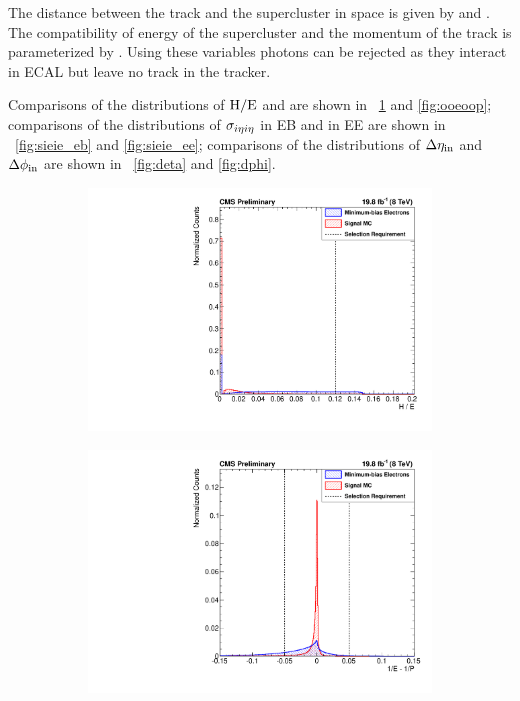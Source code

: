 The distance between the track and the supercluster in \coordetaphi space is
given by \dphiin and \detain. The compatibility of energy of the supercluster
and the momentum of the track is parameterized by \ooeoop. Using these
variables photons can be rejected as they interact in ECAL but leave no track
in the tracker.

Comparisons of the distributions of $\text{H}/\text{E}$ and \ooeoop are shown in
\FIG~\ref{fig:he} and \ref{fig:ooeoop}; comparisons of the distributions of
$\sigma_{i \eta i \eta}$ in EB and in EE are shown in \FIGS~\ref{fig:sieie_eb} and
\ref{fig:sieie_ee}; comparisons of the distributions of $\Delta \eta_{\text{in}}$ and $\Delta \phi_{\text{in}}$
are shown in \FIGS~\ref{fig:deta} and \ref{fig:dphi}.

\begin{figure}[!htbp]
    \centering
    \begin{subfigure}[b]{\StackedPlotWidth}
        \includegraphics[width=\textwidth]{figures/e_reco_var_he.pdf}
        \caption{}
        \label{fig:he}
    \end{subfigure}
    \begin{subfigure}[b]{\StackedPlotWidth}
        \includegraphics[width=\textwidth]{figures/e_reco_var_1oe_1op.pdf}

\end{subfigure}
\end{figure}
